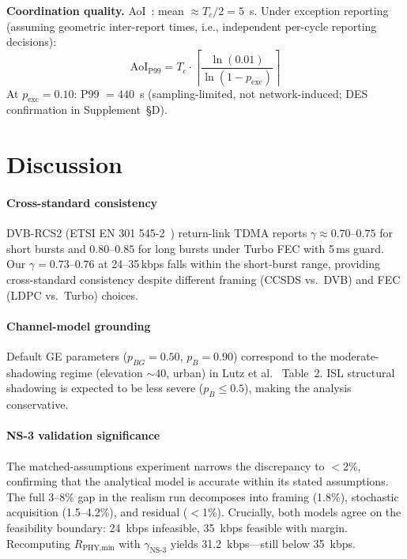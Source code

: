 \documentclass[journal]{IEEEtran}
\begin{document}
\textbf{Coordination quality.} AoI~\cite{kaul_aoi, yates_aoi}: mean $\approx T_c/2 = 5$~s. Under exception reporting (assuming geometric inter-report times, i.e., independent per-cycle reporting decisions):
\begin{equation}
    \text{AoI}_{\text{P99}} = T_c \cdot \left\lceil \frac{\ln(0.01)}{\ln(1 - p_{\text{exc}})} \right\rceil
    \label{eq:aoi_analytic}
\end{equation}
At $p_{\text{exc}} = 0.10$: P99 $= 440$~s (sampling-limited, not network-induced; DES confirmation in Supplement~\S D).

\section{Discussion}

\paragraph{Cross-standard consistency}
DVB-RCS2 (ETSI EN 301 545-2~\cite{dvb_rcs2}) return-link TDMA reports $\gamma \approx 0.70$--$0.75$ for short bursts and $0.80$--$0.85$ for long bursts under Turbo FEC with 5\,ms guard. Our $\gamma = 0.73$--$0.76$ at 24--35\,kbps falls within the short-burst range, providing cross-standard consistency despite different framing (CCSDS vs.\ DVB) and FEC (LDPC vs.\ Turbo) choices.

\paragraph{Channel-model grounding}
Default GE parameters ($p_{BG}{=}0.50$, $p_B{=}0.90$) correspond to the moderate-shadowing regime (elevation ${\sim}40$\textdegree, urban) in Lutz et al.~\cite{lutz_1991} Table~2. ISL structural shadowing is expected to be less severe ($p_B \leq 0.5$), making the analysis conservative.

\paragraph{NS-3 validation significance}
The matched-assumptions experiment narrows the discrepancy to $<$2\%, confirming that the analytical model is accurate within its stated assumptions. The full 3--8\% gap in the realism run decomposes into framing (1.8\%), stochastic acquisition (1.5--4.2\%), and residual ($<$1\%). Crucially, both models agree on the feasibility boundary: 24~kbps infeasible, 35~kbps feasible with margin. Recomputing $R_{\text{PHY,min}}$ with $\gamma_{\text{NS-3}}$ yields 31.2~kbps---still below 35~kbps.
\end{document}
